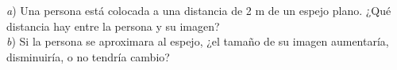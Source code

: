 \textit{a}) Una persona está colocada a una distancia de 2 m de un espejo plano. ¿Qué distancia hay entre la persona y su imagen?\\
\textit{b}) Si la persona se aproximara al espejo, ¿el tamaño de su imagen aumentaría, disminuiría, o no tendría cambio?